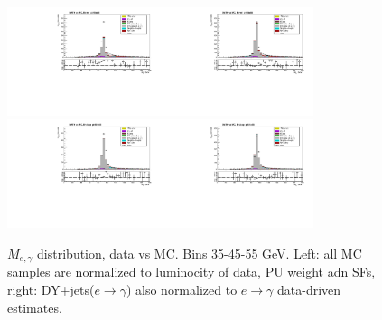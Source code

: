 \begin{figure}[htb]
\begin{center}
    \includegraphics[width=0.40\textwidth]{../figs/figs_v11/ELECTRON_WGamma/PrepareYields/c_TotalDATAvsMC_Barrel__Mpholep1PRELIMINARY_FOR_E_TO_GAMMA_WITH_PSV_CUT_pt45to55_.pdf}\includegraphics[width=0.40\textwidth]{../figs/figs_v11/ELECTRON_WGamma/PrepareYields/c_TotalDATAvsMC_Barrel__Mpholep1PRELIMINARY_FOR_E_TO_GAMMA_WITH_PSV_CUT_pt45to55__etogScale.pdf}\\
    \includegraphics[width=0.40\textwidth]{../figs/figs_v11/ELECTRON_WGamma/PrepareYields/c_TotalDATAvsMC_Endcap__Mpholep1PRELIMINARY_FOR_E_TO_GAMMA_WITH_PSV_CUT_pt45to55_.pdf}\includegraphics[width=0.40\textwidth]{../figs/figs_v11/ELECTRON_WGamma/PrepareYields/c_TotalDATAvsMC_Endcap__Mpholep1PRELIMINARY_FOR_E_TO_GAMMA_WITH_PSV_CUT_pt45to55__etogScale.pdf}\\
   \label{fig:Mpholep1DatavsMC_35to75}
  \caption{$M_{e,\gamma}$ distribution, data vs MC. Bins 35-45-55 GeV. Left: all MC samples are normalized to luminocity of data, PU weight adn SFs, right: DY+jets($e\rightarrow\gamma$) also normalized to $e\rightarrow\gamma$ data-driven estimates.}
  \end{center}
\end{figure}


